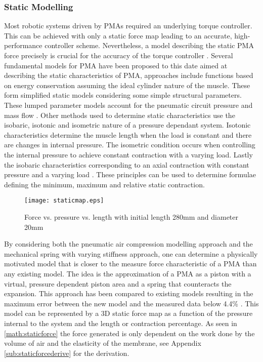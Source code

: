 \documentclass[11pt,a4paper]{article}
\begin{document}
\subsubsection{Static Modelling}
\label{sub:static_modelling}
Most robotic systems driven by PMAs required an underlying torque controller. This can be achieved with only a static force map leading to an accurate, high-performance controller scheme. Nevertheless, a model describing the static PMA force precisely is crucial for the accuracy of the torque controller \cite{martens_boblan_2017}. Several fundamental models for PMA have been proposed to this date aimed at describing the static characteristics of PMA, approaches include functions based on energy conservation assuming the ideal cylinder nature of the muscle. These form simplified static models considering some simple structural parameters. These lumped parameter models account for the pneumatic circuit pressure and mass flow \cite{chou_hannaford_1996}. Other methods used to determine static characteristics use the isobaric, isotonic and isometric nature of a pressure dependant system. Isotonic characteristics determine the muscle length when the load is constant and there are changes in internal pressure. The isometric condition occurs when controlling the internal pressure to achieve constant contraction with a varying load. Lastly the isobaric characteristics corresponding to an axial contraction with constant pressure and a varying load \cite{takosoglu_laski_blasiak_bracha_pietrala_2016}. These principles can be used to determine formulae defining the minimum, maximum and relative static contraction. \newline

\begin{figure}[hbt!]
    \centering
    \caption{Force vs. pressure vs. length with initial length 280mm and diameter 20mm}
    \texttt{[image: staticmap.eps]}
    \label{fig:staticmap}
\end{figure}

By considering both the pneumatic air compression modelling approach and the mechanical spring with varying stiffness approach, one can determine a physically motivated model that is closer to the measure force characteristic of a PMA than any existing model. The idea is the approximation of a PMA as a piston with a virtual, pressure dependent piston area and a spring that counteracts the expansion. This approach has been compared to existing models resulting in the maximum error between the new model and the measured data below 4.4\% \cite{martens_boblan_2017}. This model can be represented by a 3D static force map  as a function of the pressure internal to the system and the length or contraction percentage. As seen in \cref{math:staticforce} the force generated is only dependent on the work done by the volume of air and the elasticity of the membrane, see Appendix \cref{sub:staticforcederive} for the derivation.
\end{document}
